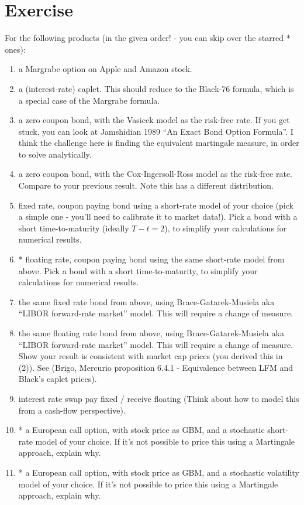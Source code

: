 \documentclass[a4paper]{article}
\begin{document}
\section*{Exercise}
For the following products (in the given order! - you can skip over the starred * ones):

\begin{enumerate}
\item a Margrabe option on Apple and Amazon stock.
\item a (interest-rate) caplet. This should reduce to the Black-76 formula, which is a special case of the Margrabe formula.
\item a zero coupon bond, with the Vasicek model as the risk-free rate. If you get stuck, you can look at Jamshidian 1989 ``An Exact Bond Option Formula''. I think the challenge here is finding the equivalent martingale measure, in order to solve analytically.
\item a zero coupon bond, with the Cox-Ingersoll-Ross model as the risk-free rate. Compare to your previous result. Note this has a different distribution.
\item fixed rate, coupon paying bond using a short-rate model of your choice (pick a simple one - you'll need to calibrate it to market data!). Pick a bond with a short time-to-maturity (ideally $T-t = 2$), to simplify your calculations for numerical results.
\item * floating rate, coupon paying bond using the same short-rate model from above. Pick a bond with a short time-to-maturity, to simplify your calculations for numerical results.
\item the same fixed rate bond from above, using Brace-Gatarek-Musiela aka ``LIBOR forward-rate market'' model. This will require a change of measure.
\item the same floating rate bond from above, using Brace-Gatarek-Musiela aka ``LIBOR forward-rate market'' model. This will require a change of measure. Show your result is consistent with market cap prices (you derived this in (2)). See (Brigo, Mercurio proposition 6.4.1 - Equivalence between LFM and Black's caplet prices).
\item interest rate swap pay fixed / receive floating (Think about how to model this from a cash-flow perspective).
\item * a European call option, with stock price as GBM, and a stochastic short-rate model of your choice. If it's not possible to price this using a Martingale approach, explain why.
\item * a European call option, with stock price as GBM, and a stochastic volatility model of your choice. If it's not possible to price this using a Martingale approach, explain why.
\end{enumerate}
\end{document}
